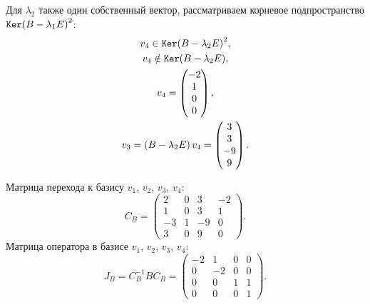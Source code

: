\documentclass[12pt]{article}
\begin{document}
    Для $\lambda_2$ также один собственный вектор, рассматриваем корневое подпространство $\mathtt{Ker}{\left ( B - \lambda_1 E \right )^2}$:
    \begin{gather*}
        v_4 \in \mathtt{Ker}{\left ( B - \lambda_2 E \right)^2}, \\
        v_4 \notin \mathtt{Ker}{\left ( B - \lambda_2 E \right)}, \\
        v_4 = \begin{pmatrix}
                  -2 \\ 1 \\ 0 \\ 0
        \end{pmatrix}, \\
        v_3
        = \left ( B - \lambda_2 E \right) v_4
        = \begin{pmatrix}
              3 \\ 3 \\ -9 \\ 9
        \end{pmatrix}.
    \end{gather*}

    Матрица перехода к базису $v_1$, $v_2$, $v_3$, $v_4$:
    \[
        C_B
        = \begin{pmatrix}
              2  & 0 & 3  & -2 \\
              1  & 0 & 3  & 1  \\
              -3 & 1 & -9 & 0  \\
              3  & 0 & 9  & 0
        \end{pmatrix}.
    \]
    Матрица оператора в базисе $v_1$, $v_2$, $v_3$, $v_4$:
    \[
        J_B
        = C_B^{-1} B C_B
        = \begin{pmatrix}
              -2 & 1  & 0 & 0 \\
              0  & -2 & 0 & 0 \\
              0  & 0  & 1 & 1 \\
              0  & 0  & 0 & 1
        \end{pmatrix}.
    \]
\end{document}
